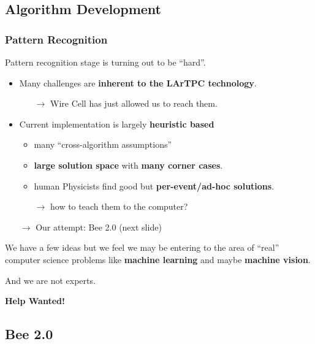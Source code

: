 \documentclass[xcolor=dvipsnames]{beamer}
\begin{document}
\subsection{Algorithm Development}

\begin{frame}
  \frametitle{Pattern Recognition}
  Pattern recognition stage is turning out to be ``hard''.
  \footnotesize
  \begin{itemize}
  \item Many challenges are \textbf{inherent to the LArTPC technology}.  
    \begin{itemize}\scriptsize
    \item[$\rightarrow$] Wire Cell has just allowed us to reach them.
    \end{itemize}
  \item Current implementation is largely \textbf{heuristic based}
    \begin{itemize}\scriptsize
    \item many ``cross-algorithm assumptions''
    \item \textbf{large solution space} with \textbf{many corner cases}.
    \item human Physicists find good but \textbf{per-event/ad-hoc solutions}.
    \item[$\rightarrow$] how to teach them to the computer?
    \end{itemize}
  \item[$\rightarrow$] Our attempt: Bee 2.0 (next slide) 
  \end{itemize}
  
  \vfill

  We have a few ideas but we feel we may be entering to the area of ``real'' computer science
  problems like \textbf{machine learning} and maybe \textbf{machine vision}.

  \vspace{2mm}

  And we are not experts. 

  \vspace{2mm}

  \textbf{Help Wanted!}

\end{frame}

\subsection{Bee 2.0}
\end{document}
